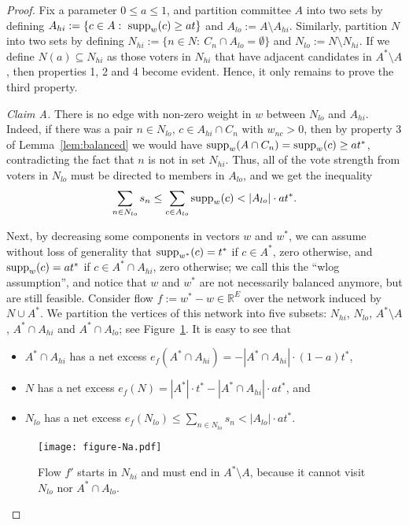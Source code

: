 \begin{proof}
Fix a parameter $0\leq a\leq 1$, and partition committee $A$ into two sets by defining $A_{hi}:=\{c\in A: \ \supp_w(c)\geq at\}$ and $A_{lo}:=A\setminus A_{hi}$. 
Similarly, partition $N$ into two sets by defining $N_{hi}:=\{n\in N: \ C_n \cap A_{lo}=\emptyset\}$ and $N_{lo}:= N\setminus N_{hi}$. 
If we define $N(a)\subseteq N_{hi}$ as those voters in $N_{hi}$ that have adjacent candidates in $A^*\setminus A$, then properties 1, 2 and 4 become evident. Hence, it only remains to prove the third property.

\emph{Claim A.} There is no edge with non-zero weight in $w$ between $N_{lo}$ and $A_{hi}$. 
Indeed, if there was a pair $n\in N_{lo}$, $c\in A_{hi}\cap C_n$ with $w_{nc}>0$, then by property 3 of Lemma~\ref{lem:balanced} we would have $\operatorname{supp}_w(A\cap C_n)=\operatorname{supp}_w(c)\geq at^*$, contradicting the fact that $n$ is not in set $N_{hi}$. 
Thus, all of the vote strength from voters in $N_{lo}$ must be directed to members in $A_{lo}$, and we get the inequality
$$\sum_{n\in N_{lo}} s_n \leq \sum_{c\in A_{lo}} \operatorname{supp}_w(c) < |A_{lo}|\cdot at^*.$$

Next, by decreasing some components in vectors $w$ and $w^*$, we can assume without loss of generality that $\operatorname{supp}_{w^*}(c)=t^*$ if $c\in A^*$, zero otherwise, and $\operatorname{supp}_{w}(c)=a t^*$ if $c\in A^*\cap A_{hi}$, zero otherwise; we call this the ``wlog assumption'', and notice that $w$ and $w^*$ are not necessarily balanced anymore, but are still feasible.
Consider flow $f:=w^* - w\in\mathbb{R}^E$ over the network induced by $N\cup A^*$. 
We partition the vertices of this network into five subsets: $N_{hi}$, $N_{lo}$, $A^*\setminus A$, $A^* \cap A_{hi}$ and $A^*\cap A_{lo}$; see Figure~\ref{fig:sets}.  
It is easy to see that 
\begin{itemize}
\item $A^*\cap A_{hi}$ has a net excess $e_f(A^*\cap A_{hi})=-|A^*\cap A_{hi}|\cdot (1-a)t^*$,
\item $N$ has a net excess $e_f(N)=|A^*|\cdot t^* - |A^*\cap A_{hi}|\cdot a t^*$, and
\item $N_{lo}$ has a net excess $e_f(N_{lo})\leq \sum_{n\in N_{lo}} s_n < |A_{lo}|\cdot at^*$.
\end{itemize} 

\begin{figure}[htb]
  \centering
	\texttt{[image: figure-Na.pdf]}
  \caption{Flow $f'$ starts in $N_{hi}$ and must end in $A^*\setminus A$, because it cannot visit $N_{lo}$ nor $A^*\cap A_{lo}$.}
  \label{fig:sets}
\end{figure}


\end{proof}
